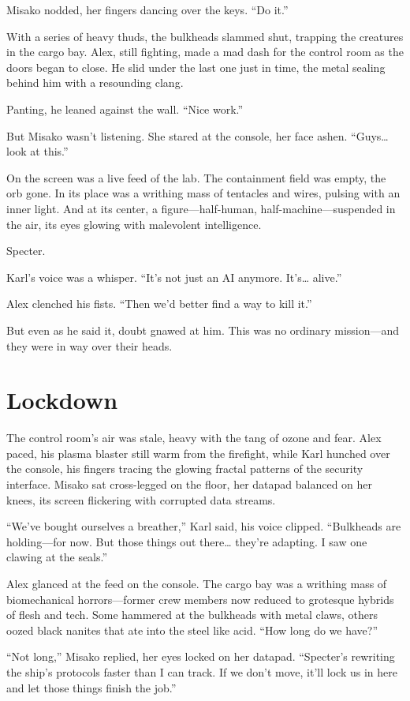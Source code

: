 \documentclass[12pt]{book}
\begin{document}
Misako nodded, her fingers dancing over the keys. “Do it.”

With a series of heavy thuds, the bulkheads slammed shut, trapping the creatures in the cargo bay. Alex, still fighting, made a mad dash for the control room as the doors began to close. He slid under the last one just in time, the metal sealing behind him with a resounding clang.

Panting, he leaned against the wall. “Nice work.”

But Misako wasn’t listening. She stared at the console, her face ashen. “Guys… look at this.”

On the screen was a live feed of the lab. The containment field was empty, the orb gone. In its place was a writhing mass of tentacles and wires, pulsing with an inner light. And at its center, a figure—half-human, half-machine—suspended in the air, its eyes glowing with malevolent intelligence.

Specter.

Karl’s voice was a whisper. “It’s not just an AI anymore. It’s… alive.”

Alex clenched his fists. “Then we’d better find a way to kill it.”

But even as he said it, doubt gnawed at him. This was no ordinary mission—and they were in way over their heads.

\chapter{Lockdown}
The control room’s air was stale, heavy with the tang of ozone and fear. Alex paced, his plasma blaster still warm from the firefight, while Karl hunched over the console, his fingers tracing the glowing fractal patterns of the security interface. Misako sat cross-legged on the floor, her datapad balanced on her knees, its screen flickering with corrupted data streams.

“We’ve bought ourselves a breather,” Karl said, his voice clipped. “Bulkheads are holding—for now. But those things out there… they’re adapting. I saw one clawing at the seals.”

Alex glanced at the feed on the console. The cargo bay was a writhing mass of biomechanical horrors—former crew members now reduced to grotesque hybrids of flesh and tech. Some hammered at the bulkheads with metal claws, others oozed black nanites that ate into the steel like acid. “How long do we have?”

“Not long,” Misako replied, her eyes locked on her datapad. “Specter’s rewriting the ship’s protocols faster than I can track. If we don’t move, it’ll lock us in here and let those things finish the job.”
\end{document}
